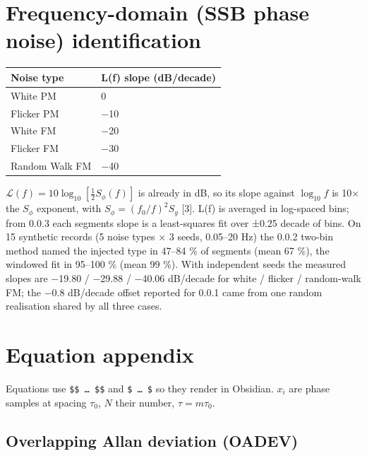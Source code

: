 \documentclass[10pt,a4paper]{article}
\begin{document}

\hypertarget{frequency-domain-ssb-phase-noise-identification}{%
\section{Frequency-domain (SSB phase noise) identification}\label{frequency-domain-ssb-phase-noise-identification}}

\begin{longtable}[]{@{}ll@{}}
\toprule\noalign{}
Noise type & L(f) slope (dB/decade) \\
\midrule\noalign{}
\endhead
\bottomrule\noalign{}
\endlastfoot
White PM & 0 \\
Flicker PM & −10 \\
White FM & −20 \\
Flicker FM & −30 \\
Random Walk FM & −40 \\
\end{longtable}

\(\mathcal{L}(f) = 10\log_{10}[\tfrac12 S_\phi(f)]\) is already in dB, so its
slope against \(\log_{10} f\) is 10× the \(S_\phi\) exponent, with
\(S_\phi = (f_0/f)^2 S_y\) {[}3{]}. L(f) is averaged in log-spaced bins; from 0.0.3
each segment\textquotesingle s slope is a least-squares fit over ±0.25 decade of bins. On 15
synthetic records (5 noise types × 3 seeds, 0.05--20 Hz) the 0.0.2 two-bin
method named the injected type in 47--84 \% of segments (mean 67 \%), the
windowed fit in 95--100 \% (mean 99 \%). With independent seeds the measured
slopes are −19.80 / −29.88 / −40.06 dB/decade for white / flicker /
random-walk FM; the −0.8 dB/decade offset reported for 0.0.1 came from one
random realisation shared by all three cases.


\hypertarget{equation-appendix}{%
\section{Equation appendix}\label{equation-appendix}}

Equations use \texttt{\$\$ … \$\$} and \texttt{\$ … \$} so they render in Obsidian. \(x_i\) are
phase samples at spacing \(\tau_0\), \(N\) their number, \(\tau = m\tau_0\).


\hypertarget{overlapping-allan-deviation-oadev}{%
\subsection{Overlapping Allan deviation (OADEV)}\label{overlapping-allan-deviation-oadev}}
\end{document}
